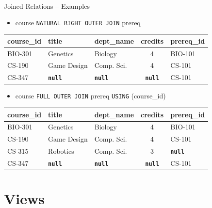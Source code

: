 \documentclass[aspectratio=169]{beamer}
\begin{document}
\begin{frame}{Joined Relations – Examples}
    \normalsize
    \begin{itemize}
        \item course \texttt{NATURAL RIGHT OUTER JOIN} prereq
    \end{itemize}
    \scriptsize
    \begin{tabular}{| l | l | l | c | l |}
        \hline
        \textbf{course\_id} & \textbf{title} & \textbf{dept\_name} & \textbf{credits} & \textbf{prereq\_id} \\
        \hline
        BIO-301 & Genetics    & Biology    & 4 & BIO-101 \\
        \hline
        CS-190  & Game Design & Comp. Sci. & 4 & CS-101  \\
        \hline
        CS-347  & \texttt{\textbf{null}} & \texttt{\textbf{null}} & \texttt{\textbf{null}} & CS-101  \\
        \hline
    \end{tabular}
    \vspace{5mm}
    \normalsize
    \begin{itemize}
        \item course \texttt{FULL OUTER JOIN} prereq \texttt{USING} (course\_id)
    \end{itemize}
    \scriptsize
    \begin{tabular}{| l | l | l | c | l |}
        \hline
        \textbf{course\_id} & \textbf{title} & \textbf{dept\_name} & \textbf{credits} & \textbf{prereq\_id} \\
        \hline
        BIO-301 & Genetics    & Biology    & 4 & BIO-101 \\
        \hline
        CS-190  & Game Design & Comp. Sci. & 4 & CS-101  \\
        \hline
        CS-315  & Robotics    & Comp. Sci. & 3 & \textbf{\texttt{null}} \\
        \hline
        CS-347  & \texttt{\textbf{null}} & \texttt{\textbf{null}} & \texttt{\textbf{null}} & CS-101  \\
        \hline
    \end{tabular}
\end{frame}

\section{Views}
\end{document}
